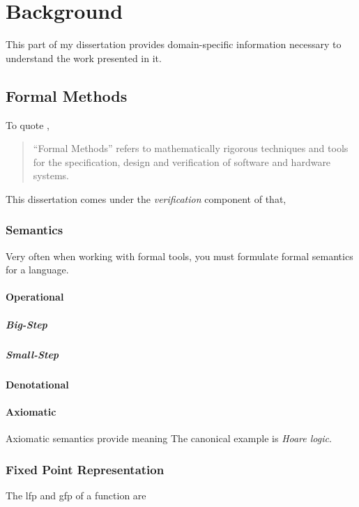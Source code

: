 \chapter{Background}\label{ch:background}
This part of my dissertation provides domain-specific information necessary to understand
the work presented in it.

\section{Formal Methods}
To quote \textcite{butler:fm},
\begin{quote}
  ``Formal Methods''%
  refers to mathematically rigorous techniques and tools
  for the specification, design and verification of software and hardware systems.
\end{quote}
This dissertation comes under the \emph{verification} component of that,%

\subsection{Semantics}
Very often when working with formal tools, you must formulate formal semantics
for a language.

\Textcite{schmidt2003pls}

\subsubsection{Operational}
\paragraph{Big-Step}
\paragraph{Small-Step}

\subsubsection{Denotational}

\subsubsection{Axiomatic}
Axiomatic semantics provide meaning 
The canonical example is \emph{Hoare logic}.%

\subsection{Fixed Point Representation}
The \ac{lfp} and \ac{gfp} of a function are

